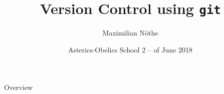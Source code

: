 \documentclass[
  aspectratio=1610,
]{beamer}
\author[M. Nöthe]{Maximilian Nöthe}
\title[VC with Git]{Version Control using \texttt{git}}
\date[June \nth{4}, 2018]{\nth{2} Asterics-Obelics School 2 – \nth{4} of June 2018 }
\institute[TU Dortmund]{Astroparticle Physics, TU Dortmund}
\begin{document}
\maketitle

\begin{frame}[c]{Overview}
\tableofcontents
\end{frame}





\end{document}
